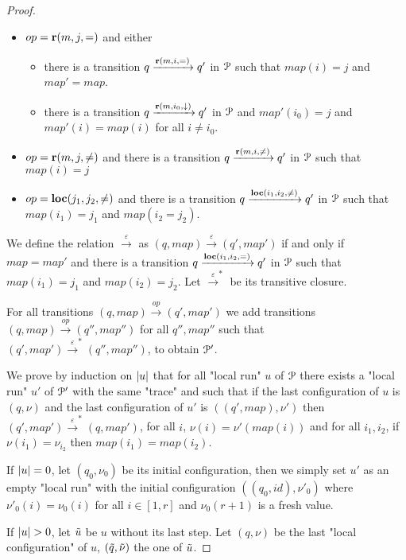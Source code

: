 \begin{proof}
\begin{itemize}
		\item $op = \textbf{r}(m, j, {=})$ and either
		\begin{itemize}
			\item there is a transition $q \xrightarrow{\textbf{r}(m, i, {=})} q'$ in $\mathcal{P}$ such that $map(i)=j$ and $map'=map$.
			
			\item there is a transition $q \xrightarrow{\textbf{r}(m, i_0, \downarrow)} q'$ in $\mathcal{P}$ and $map'(i_0)=j$ and $map'(i) = map(i)$ for all $i \neq i_0$.
		\end{itemize} 
		
		\item $op = \textbf{r}(m, j, {\ne})$ and there is a transition $q \xrightarrow{\textbf{r}(m, i, {\ne})} q'$ in $\mathcal{P}$ such that $map(i)=j$
		
		\item $op=\textbf{loc}(j_1,j_2,{\ne})$ and there is a transition $q \xrightarrow{\textbf{loc}(i_1,i_2,{\ne})} q'$ in $\mathcal{P}$ such that $map(i_1)=j_1$ and $map(i_2 = j_2)$.
	\end{itemize}
	
	
	We define the relation $\xrightarrow{\varepsilon}$ as $(q, map) \xrightarrow{\varepsilon} (q', map')$ if and only if $map=map'$ and there is a transition $q \xrightarrow{\textbf{loc}(i_1,i_2,{=})} q'$ in $\mathcal{P}$ such that $map(i_1)=j_1$ and $map(i_2) = j_2$.
	Let $\xrightarrow{\varepsilon}^*$ be its transitive closure.
	
	For all transitions $(q,map) \xrightarrow{op} (q', map')$ we add transitions $(q,map) \xrightarrow{op} (q'', map'')$ for all $q'', map''$ such that $(q', map') \xrightarrow{\varepsilon}^* (q'', map'')$, to obtain $\mathcal{P}'$.
	
	We prove by induction on $|u|$ that for all "local run" $u$ of $\mathcal{P}$ there exists a "local run" $u'$ of $\mathcal{P}'$ with the same "trace" and such that if the last configuration of $u$ is $(q,\nu)$ and the last configuration of $u'$ is $((q',map), \nu')$ then $(q', map') \xrightarrow{\varepsilon}^* (q, map')$, for all $i$, $\nu(i) = \nu'(map(i))$ and for all $i_1, i_2$, if $\nu(i_1)=\nu_{i_2}$ then $map(i_1) = map(i_2)$.  
	
	If $|u| = 0$, let $(q_0, \nu_0)$ be its initial configuration, then we simply set $u'$ as an empty "local run" with the initial configuration $((q_0, id), \nu'_0)$ where $\nu'_0(i) = \nu_0(i)$ for all $i \in [1,r]$ and $\nu_0(r+1)$ is a fresh value.
	
	If $\size{u}>0$, let $\Tilde{u}$ be $u$ without its last step. Let $(q, \nu)$ be the last "local configuration" of $u$, $(\Tilde{q}, \Tilde{\nu})$ the one of $\Tilde{u}$.
	

\end{proof}
